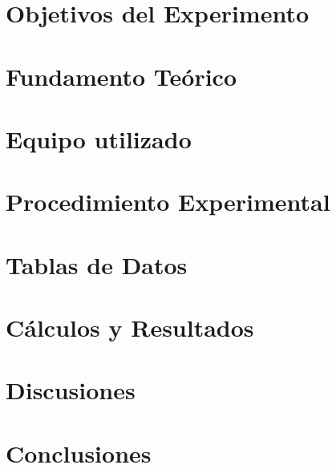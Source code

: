 \documentclass[12pt,a4paper]{article}
\begin{document}

\pagestyle{fancy}
\fancyfoot{}
\fancyfoot[R]{\textit{\thepage}}
\tableofcontents

\newpage
\section{Objetivos del Experimento} %

\section{Fundamento Teórico} %

\clearpage
\section{Equipo utilizado} %

\newpage
\section{Procedimiento Experimental} %

\section{Tablas de Datos} %

\section{Cálculos y Resultados} %

\section{Discusiones} %

\section{Conclusiones} %

\end{document}
